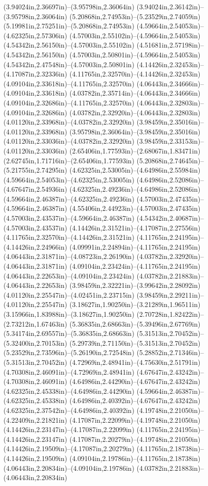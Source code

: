 (3.94024in,2.36697in)--(3.95798in,2.36064in) (3.94024in,2.36142in)--(3.95798in,2.36064in) (5.20868in,2.74953in)--(5.23529in,2.74059in) (5.19981in,2.75251in)--(5.20868in,2.74953in) (4.59664in,2.54053in)--(4.62325in,2.57306in) (4.57003in,2.55102in)--(4.59664in,2.54053in) (4.54342in,2.56150in)--(4.57003in,2.55102in) (4.51681in,2.57198in)--(4.54342in,2.56150in) (4.57003in,2.50801in)--(4.59664in,2.54053in) (4.54342in,2.47548in)--(4.57003in,2.50801in) (4.14426in,2.32453in)--(4.17087in,2.32336in) (4.11765in,2.32570in)--(4.14426in,2.32453in) (4.09104in,2.33618in)--(4.11765in,2.32570in) (4.06443in,2.34666in)--(4.09104in,2.33618in) (4.03782in,2.35714in)--(4.06443in,2.34666in) (4.09104in,2.32686in)--(4.11765in,2.32570in) (4.06443in,2.32803in)--(4.09104in,2.32686in) (4.03782in,2.32920in)--(4.06443in,2.32803in) (4.01120in,2.33968in)--(4.03782in,2.32920in) (3.98459in,2.35016in)--(4.01120in,2.33968in) (3.95798in,2.36064in)--(3.98459in,2.35016in) (4.01120in,2.33036in)--(4.03782in,2.32920in) (3.98459in,2.33153in)--(4.01120in,2.33036in) (2.65406in,1.77593in)--(2.68067in,1.83471in) (2.62745in,1.71716in)--(2.65406in,1.77593in) (5.20868in,2.74645in)--(5.21755in,2.74295in) (4.62325in,2.53005in)--(4.64986in,2.55984in) (4.59664in,2.54053in)--(4.62325in,2.53005in) (4.64986in,2.52086in)--(4.67647in,2.54936in) (4.62325in,2.49236in)--(4.64986in,2.52086in) (4.59664in,2.46387in)--(4.62325in,2.49236in) (4.57003in,2.47435in)--(4.59664in,2.46387in) (4.55406in,2.44923in)--(4.57003in,2.47435in) (4.57003in,2.43537in)--(4.59664in,2.46387in) (4.54342in,2.40687in)--(4.57003in,2.43537in) (4.14426in,2.31521in)--(4.17087in,2.27556in) (4.11765in,2.32570in)--(4.14426in,2.31521in) (4.11765in,2.24195in)--(4.14426in,2.24966in) (4.09991in,2.24894in)--(4.11765in,2.24195in) (4.06443in,2.31871in)--(4.08723in,2.26190in) (4.03782in,2.32920in)--(4.06443in,2.31871in) (4.09104in,2.23424in)--(4.11765in,2.24195in) (4.06443in,2.22653in)--(4.09104in,2.23424in) (4.03782in,2.21883in)--(4.06443in,2.22653in) (3.98459in,2.32221in)--(3.99642in,2.28092in) (4.01120in,2.25547in)--(4.02451in,2.23715in) (3.98459in,2.29211in)--(4.01120in,2.25547in) (3.18627in,1.90250in)--(3.21289in,1.96511in) (3.15966in,1.83988in)--(3.18627in,1.90250in) (2.70728in,1.82422in)--(2.73212in,1.67463in) (5.36835in,2.68663in)--(5.39496in,2.67769in) (5.34174in,2.69557in)--(5.36835in,2.68663in) (5.31513in,2.70452in)--(5.32400in,2.70153in) (5.29739in,2.71150in)--(5.31513in,2.70452in) (5.23529in,2.73596in)--(5.26190in,2.72548in) (5.28852in,2.71346in)--(5.31513in,2.70452in) (4.72969in,2.48941in)--(4.75630in,2.51791in) (4.70308in,2.46091in)--(4.72969in,2.48941in) (4.67647in,2.43242in)--(4.70308in,2.46091in) (4.64986in,2.44290in)--(4.67647in,2.43242in) (4.62325in,2.45338in)--(4.64986in,2.44290in) (4.59664in,2.46387in)--(4.62325in,2.45338in) (4.64986in,2.40392in)--(4.67647in,2.43242in) (4.62325in,2.37542in)--(4.64986in,2.40392in) (4.19748in,2.21050in)--(4.22409in,2.21821in) (4.17087in,2.22099in)--(4.19748in,2.21050in) (4.14426in,2.23147in)--(4.17087in,2.22099in) (4.11765in,2.24195in)--(4.14426in,2.23147in) (4.17087in,2.20279in)--(4.19748in,2.21050in) (4.14426in,2.19509in)--(4.17087in,2.20279in) (4.11765in,2.18738in)--(4.14426in,2.19509in) (4.09104in,2.19786in)--(4.11765in,2.18738in) (4.06443in,2.20834in)--(4.09104in,2.19786in) (4.03782in,2.21883in)--(4.06443in,2.20834in) 